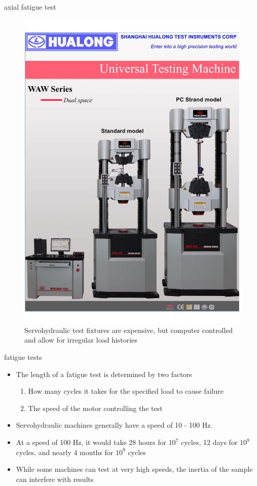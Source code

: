 \documentclass[10pt]{beamer}
\begin{document}
\begin{frame}{axial fatigue test}
	\begin{figure}
	\centering
	\includegraphics[width=0.7\linewidth]{../Figures/servohydraulic}
	\caption{Servohydraulic test fixtures are expensive, but computer controlled and allow for irregular load histories}
	\label{fig:servohydraulic}
	\end{figure}
\end{frame}

\begin{frame}{fatigue tests}
	\begin{itemize}[<+->]
		\item The length of a fatigue test is determined by two factors
		\begin{enumerate}
			\item How many cycles it takes for the specified load to cause failure
			\item The speed of the motor controlling the test
		\end{enumerate}
		\item Servohydraulic machines generally have a speed of 10 - 100 Hz.
		\item At a speed of 100 Hz, it would take 28 hours for $10^7$ cycles, 12 days for $10^8$ cycles, and nearly 4 months for $10^9$ cycles
		\item While some machines can test at very high speeds, the inertia of the sample can interfere with results
	\end{itemize}
\end{frame}
\end{document}
